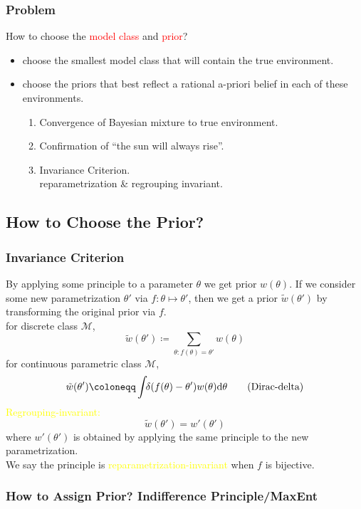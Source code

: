 \documentclass[UTF8,11pt,colorlinks,compress,openany]{beamer}%
\begin{document}
\begin{frame}\frametitle{Problem}
	\begin{block}{How to choose the \textcolor{red}{model class} and \textcolor{red}{prior}?}
		\begin{itemize}
			\item choose the smallest model class that will contain the true environment.
			\item choose the priors that best reflect a rational a-priori belief in each of these environments.
			\begin{enumerate}
				\item Convergence of Bayesian mixture to true environment.
				\item Confirmation of ``the sun will always rise''.
				\item Invariance Criterion.\\
				reparametrization \& regrouping invariant.
			\end{enumerate}
		\end{itemize}
	\end{block}
\end{frame}

\subsection{How to Choose the Prior?}

\begin{frame}\frametitle{Invariance Criterion}
	By applying some principle to a parameter $\theta$ we get prior $w(\theta)$. If we consider some new parametrization $\theta'$ via $f:\theta\mapsto\theta'$, then we get a prior $\tilde{w}(\theta')$ by transforming the original prior via $f$.\\
	for discrete class $\mathcal{M}$,
	\[\tilde{w}(\theta')\coloneqq \sum\limits_{\theta:f(\theta)=\theta'}\!\!\!\!w(\theta)\]
	for continuous parametric class $\mathcal{M}$, 
	\[\tilde{w}(\theta')\coloneqq \int\!\!\delta(f(\theta)-\theta') w(\theta)\mathrm{d}\theta\tag{\text{Dirac-delta}}\]	
	\textcolor{yellow}{Regrouping-invariant:} $$\tilde{w}(\theta')=w'(\theta')$$ where $w'(\theta')$ is obtained by applying the same principle to the new parametrization.\\
	We say the principle is \textcolor{yellow}{reparametrization-invariant} when $f$ is bijective.
\end{frame}

\begin{frame}\frametitle{How to Assign Prior? Indifference Principle/MaxEnt}
	\begin{figure}[H]
	\end{figure}
\end{frame}
\end{document}
